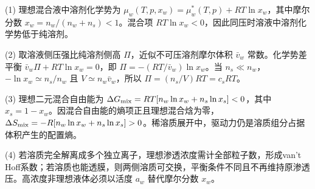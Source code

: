 (1) 理想混合液中溶剂化学势为 \(\mu_w(T,p,x_w)=\mu_w^*(T,p)+RT\ln x_w\)，其中摩尔分数 \(x_w=n_w/(n_w+n_s)<1\)。混合项 \(RT\ln x_w<0\)，因此同压时溶液中溶剂化学势低于纯溶剂。

(2) 取溶液侧压强比纯溶剂侧高 \(\Pi\)，近似不可压溶剂摩尔体积 \(\bar v_w\) 常数。化学势差平衡 \(\bar v_w\Pi+RT\ln x_w=0\)，即 \(\Pi=-(RT/\bar v_w)\ln x_w\)。当 \(n_s\ll n_w\)，\(-\ln x_w\simeq n_s/n_w\) 且 \(V\simeq n_w\bar v_w\)，所以 \(\boxed{\Pi=(n_s/V)RT=c_sRT}\)。

(3) 理想二元混合自由能为 \(\Delta G_{\rm mix}=RT[n_w\ln x_w+n_s\ln x_s]<0\)，其中 \(x_s=1-x_w\)。因混合自由能的熵项正且理想混合焓为零，\(\Delta S_{\rm mix}=-R[n_w\ln x_w+n_s\ln x_s]>0\)。稀溶质展开中，驱动力仍是溶质组分占据体积产生的配置熵。

(4) 若溶质完全解离成多个独立离子，理想渗透浓度需计全部粒子数，形成van't Hoff系数；若溶质也能透膜，则两侧溶质可交换，平衡条件不同且不再维持原渗透压。高浓度非理想液体必须以活度 \(a_w\) 替代摩尔分数 \(x_w\)。
